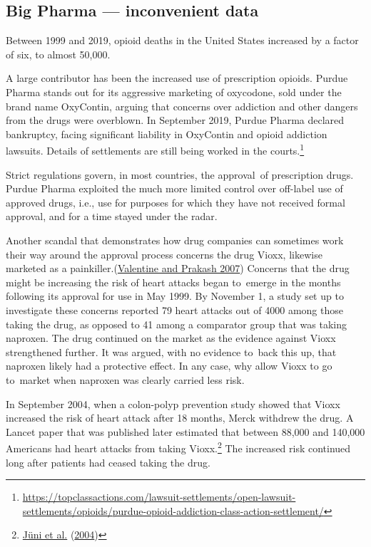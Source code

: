 \documentclass[
  10pt,
  b5paper]{book}
\begin{document}
\hypertarget{big-pharma-inconvenient-data}{%
\subsection*{Big Pharma --- inconvenient data}\label{big-pharma-inconvenient-data}}

Between 1999 and 2019, opioid deaths in the United States increased
by a factor of six, to almost 50,000.

A large contributor has been the increased use of prescription
opioids. Purdue Pharma stands out for its aggressive marketing of
oxycodone, sold under the brand name OxyContin, arguing that
concerns over addiction and other dangers from the drugs were
overblown. In September 2019, Purdue Pharma declared bankruptcy,
facing significant liability in OxyContin and opioid addiction
lawsuits. Details of settlements are still being worked in the
courts.\footnote{ \url{https://topclassactions.com/lawsuit-settlements/open-lawsuit-settlements/opioids/purdue-opioid-addiction-class-action-settlement/}}

Strict regulations govern, in most countries, the approval~of
prescription drugs. Purdue Pharma exploited the much more
limited control over off-label use of approved drugs, i.e.,
use for purposes for which they have not received formal
approval, and for a time stayed under the radar.

Another scandal that demonstrates how drug companies can
sometimes work their way around the approval process
concerns the drug Vioxx, likewise marketed as a
painkiller.(\protect\hyperlink{ref-valentine2007timeline}{Valentine and Prakash 2007}) Concerns that the
drug might be increasing the risk of heart attacks began
to~emerge in the months following its approval for use
in May 1999. By November 1, a study set up to investigate
these concerns reported 79 heart attacks out of 4000
among those taking the drug, as opposed to 41 among a
comparator group that was taking naproxen. The drug
continued on the market as the evidence against Vioxx
strengthened further. It was argued, with no evidence
to~back this up, that naproxen likely had a protective
effect. In any case, why allow Vioxx to go to~market
when naproxen was clearly carried less risk.

In September 2004,
when a colon-polyp prevention study showed that Vioxx
increased the risk of heart attack after 18 months,
Merck withdrew the drug. A Lancet paper that was
published later estimated that between 88,000 and
140,000 Americans had heart attacks from taking
Vioxx.\footnote{\protect\hyperlink{ref-juni2004risk}{Jüni et al.} (\protect\hyperlink{ref-juni2004risk}{2004})} The increased risk continued
long after patients had ceased taking the drug.
\end{document}
